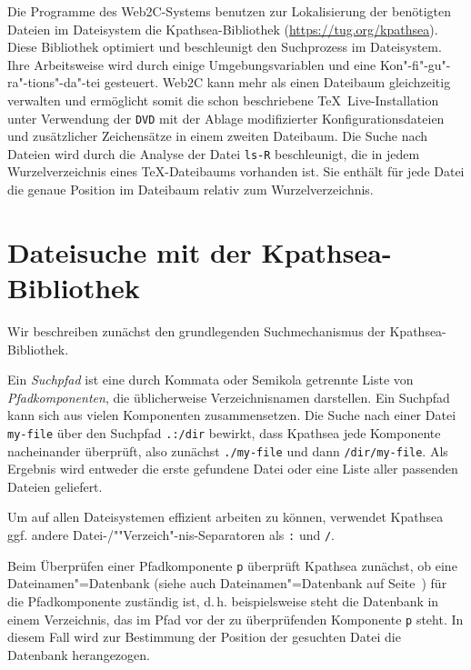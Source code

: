 \documentclass[12pt,ngerman,a4paper,fullparskip]{scrreprt}
\newcommand{\TL}{\TeX\ Live\xspace}
\newcommand{\acro}[1]{\texttt{#1}}
\newcommand{\file}[1]{\texttt{#1}}
\newcommand{\KPS}{Kpathsea\xspace}
\newcommand{\var}[1]{\texttt{#1}}
\newcommand{\samp}[1]{\texttt{#1}}
\providecommand*{\DVD}{\acro{DVD}\xspace}
\begin{document}
\noindent Die Programme des Web2C-Systems benutzen zur Lokalisierung der benötigten
Dateien im Dateisystem die \KPS-Bibliothek (\url{https://tug.org/kpathsea}). Diese Bibliothek optimiert und beschleunigt den Suchprozess im Dateisystem. Ihre Arbeitsweise wird durch
einige Umgebungsvariablen und eine Kon"-fi"-gu"-ra"-tions"-da"-tei gesteuert.
Web2C kann mehr als einen Dateibaum gleichzeitig verwalten und ermöglicht
somit die schon beschriebene \TL-Installation unter Verwendung der
{\DVD} mit der Ablage modifizierter Konfigurationsdateien
und zusätzlicher Zeichensätze in einem zweiten Dateibaum. Die Suche
nach Dateien wird durch die Analyse der Datei \file{ls-R} beschleunigt,
die in jedem Wurzelverzeichnis eines \TeX-Dateibaums vorhanden ist.
Sie enthält für jede Datei die genaue Position im Dateibaum relativ
zum Wurzelverzeichnis.


\section{Dateisuche mit der Kpathsea-Bibliothek}
\label{sec:kpathsea}

Wir beschreiben zunächst den grundlegenden Suchmechanismus der \KPS-Bibliothek.

Ein \textit{Suchpfad} ist eine durch Kommata oder Semikola getrennte Liste von
\textit{Pfadkomponenten}, die üblicherweise Verzeichnisnamen darstellen.
Ein Suchpfad kann sich aus vielen Komponenten zusammensetzen. Die Suche nach
einer Datei \samp{my-file} über den Suchpfad \samp{.:/dir} bewirkt, dass
{\KPS} jede Komponente nacheinander überprüft, also zunächst
\samp{./my-file} und dann \samp{/dir/my-file}. Als Ergebnis wird entweder die
erste gefundene Datei oder eine Liste aller passenden Dateien geliefert.

Um auf allen Dateisystemen effizient arbeiten zu können, verwendet {\KPS} ggf. andere Datei-/""Verzeich"-nis-Separatoren als \samp{:} und \samp{/}.

Beim Überprüfen einer Pfadkomponente \var{p} überprüft {\KPS} zunächst,
ob eine Dateinamen"=Datenbank (siehe auch Dateinamen"=Datenbank auf
Seite~\pageref{sec:filename-database}) für die Pfadkomponente zuständig ist,
d.\,h. beispielsweise steht die Datenbank in einem Verzeichnis, das im Pfad
vor der zu überprüfenden Komponente \var{p} steht. In diesem Fall wird
zur Bestimmung der Position der gesuchten Datei die Datenbank herangezogen.
\end{document}
